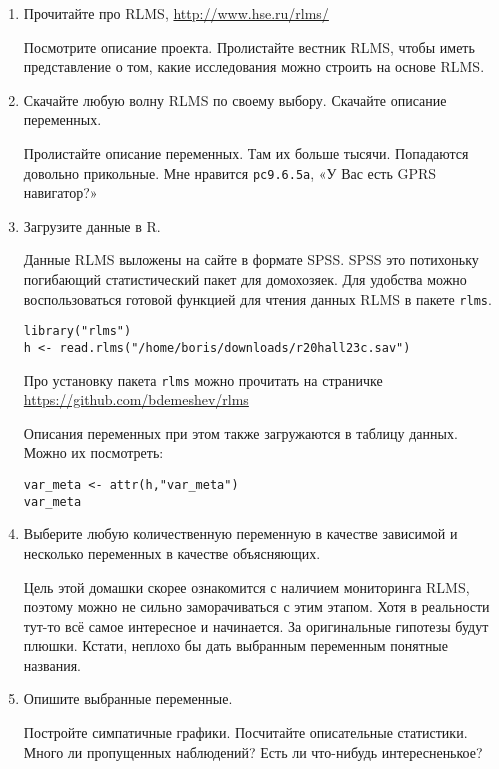 \documentclass[12pt, a4paper]{article}
\theoremstyle{definition}
\begin{document}
\begin{enumerate}
\item Прочитайте про RLMS, \url{http://www.hse.ru/rlms/}

Посмотрите описание проекта. Пролистайте вестник RLMS, чтобы иметь представление о том, какие исследования можно строить на основе RLMS.

\item Скачайте любую волну RLMS по своему выбору. Скачайте описание переменных.

Пролистайте описание переменных. Там их больше тысячи. Попадаются довольно прикольные. Мне нравится \verb|pc9.6.5a|, «У Вас есть GPRS навигатор?»

\item Загрузите данные в R.

Данные RLMS выложены на сайте в формате SPSS. SPSS это потихоньку погибающий статистический пакет для домохозяек. Для удобства можно воспользоваться готовой функцией для чтения данных RLMS в пакете \verb|rlms|.
\begin{verbatim}
library("rlms")
h <- read.rlms("/home/boris/downloads/r20hall23c.sav")
\end{verbatim}
Про установку пакета \verb|rlms| можно прочитать на страничке \url{https://github.com/bdemeshev/rlms}

Описания переменных при этом также загружаются в таблицу данных. Можно их посмотреть:
\begin{verbatim}
var_meta <- attr(h,"var_meta")
var_meta
\end{verbatim}

\item Выберите любую количественную переменную в качестве зависимой и несколько переменных в качестве объясняющих.

Цель этой домашки скорее ознакомится с наличием мониторинга RLMS, поэтому можно не сильно заморачиваться с этим этапом. Хотя в реальности тут-то всё самое интересное и начинается. За оригинальные гипотезы будут плюшки. Кстати, неплохо бы дать выбранным переменным понятные названия.

\item Опишите выбранные переменные.

Постройте симпатичные графики. Посчитайте описательные статистики. Много ли пропущенных наблюдений? Есть ли что-нибудь интересненькое?


\end{enumerate}
\end{document}
